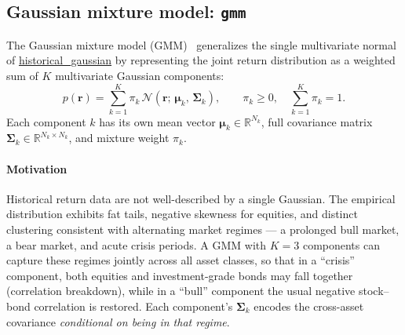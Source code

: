 \documentclass[fleqn,12pt]{report}
\newcommand{\code}[1]{\url{#1}}
\begin{document}
\subsection{Gaussian mixture model: \texttt{gmm}}

The Gaussian mixture model (GMM)~\cite{mclachlan2000} generalizes the
single multivariate normal of \code{historical_gaussian} by representing
the joint return distribution as a weighted sum of $K$ multivariate
Gaussian components:
\begin{equation}
    p(\bm{r}) = \sum_{k=1}^{K} \pi_k\,
                \mathcal{N}\!\left(\bm{r};\,\bm{\mu}_k,\,\bm{\Sigma}_k\right),
    \qquad \pi_k \ge 0,\quad \sum_{k=1}^{K}\pi_k = 1.
\end{equation}
Each component $k$ has its own mean vector $\bm{\mu}_k \in \mathbb{R}^{N_k}$,
full covariance matrix $\bm{\Sigma}_k \in \mathbb{R}^{N_k \times N_k}$, and
mixture weight $\pi_k$.

\paragraph*{Motivation}
Historical return data are not well-described by a single Gaussian.
The empirical distribution exhibits fat tails, negative skewness for equities,
and distinct clustering consistent with alternating market regimes --- a
prolonged bull market, a bear market, and acute crisis periods.
A GMM with $K = 3$ components can capture these regimes jointly across all
asset classes, so that in a ``crisis'' component, both equities and investment-grade
bonds may fall together (correlation breakdown), while in a ``bull'' component the
usual negative stock--bond correlation is restored.
Each component's $\bm{\Sigma}_k$ encodes the cross-asset covariance
\emph{conditional on being in that regime}.
\end{document}
